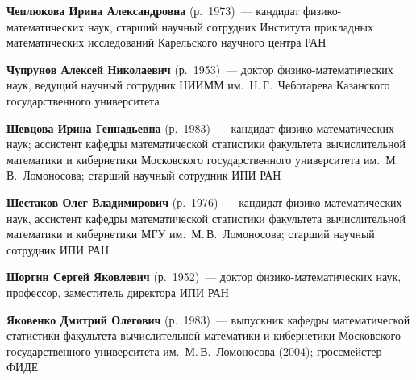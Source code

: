 \begin{multicols}{2}
\vspace*{6pt}

\noindent
\textbf{Чеплюкова Ирина Александровна} (р.\ 1973)~--- 
кандидат физико-математических наук, старший научный 
сотрудник Института прикладных математических исследований Карельского научного центра РАН

\vspace*{6pt}


\noindent
\textbf{Чупрунов Алексей Николаевич} (р.\ 1953)~--- доктор фи\-зи\-ко-математических наук, 
ведущий научный сотрудник НИИММ им.\ Н.\,Г.~Чеботарева Казанского государственного университета

\vspace*{6pt}

\noindent
\textbf{Шевцова Ирина Геннадьевна}  (р.\ 1983)~--- 
кандидат фи\-зи\-ко-математических наук; ассистент кафедры математической 
статистики факультета вычислительной математики и кибернетики 
Московского государственного университета им.\ М.\,В.~Ломоносова;
старший научный сотрудник ИПИ РАН


\vspace*{3pt}

\noindent
\textbf{Шестаков Олег Владимирович} (р.\ 1976)~--- кандидат фи\-зи\-ко-математических наук,
ассистент ка\-фед\-ры математической статистики факультета вычислительной математики и кибернетики
МГУ им.~М.\,В.~Ломоносова; старший научный сотрудник ИПИ РАН

\columnbreak

    

\noindent
\textbf{Шоргин Сергей Яковлевич} (р.\ 1952)~--- доктор 
фи\-зи\-ко-математических наук, профессор, заместитель директора ИПИ РАН 



\vspace*{6pt}

\noindent
\textbf{Яковенко Дмитрий Олегович} (р.\ 1983)~--- выпускник кафедры математической 
статистики факультета вычислительной математики и кибернетики 
Московского государственного университета им.\ М.\,В.~Ломоносова (2004); 
гроссмейстер ФИДЕ

\end{multicols}

\def\tit{\ }
\def\aut{\ }
\def\auf{\ }
\def\leftkol{ABOUT AUTHORS}
\def\rightkol{ABOUT AUTHORS}

\titele{\tit}{\aut}{\auf}{\leftkol}{\rightkol}


